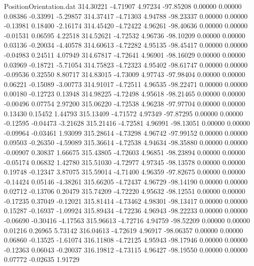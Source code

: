 \begin{filecontents}{PositionOrientation.dat}
 314.30221   -4.71907    4.97234   -97.85208    0.00000    0.00000    0.08386   -0.33991   -5.29857
 314.37417   -4.71303    4.94788   -98.23337    0.00000    0.00000   -0.13981    0.18400   -2.16174
 314.45420   -4.72422    4.96261   -98.40636    0.00000    0.00000   -0.01531    0.06595    4.22518
 314.52621   -4.72532    4.96736   -98.10209    0.00000    0.00000    0.03136   -0.20034   -4.40578
 314.60613   -4.72282    4.95135   -98.45417    0.00000    0.00000   -0.04983    0.24511    4.07949
 314.67817   -4.72641    4.96901   -98.16029    0.00000    0.00000    0.03969   -0.18721   -5.71054
 314.75823   -4.72323    4.95402   -98.61747    0.00000    0.00000   -0.09536    0.32550    8.80717
 314.83015   -4.73009    4.97743   -97.98404    0.00000    0.00000    0.06221   -0.15089   -3.00773
 314.91017   -4.72511    4.96535   -98.22471    0.00000    0.00000    0.00180   -0.12723    0.13948
 314.98225   -4.72498    4.95618   -98.21465    0.00000    0.00000   -0.00496    0.07754    2.97200
 315.06220   -4.72538    4.96238   -97.97704    0.00000    0.00000    0.13430    0.15452    1.44793
 315.13409   -4.71572    4.97349   -97.87295    0.00000    0.00000   -0.12595   -0.04473   -3.21628
 315.21416   -4.72581    4.96991   -98.13051    0.00000    0.00000   -0.09964   -0.03461    1.93099
 315.28614   -4.73298    4.96742   -97.99152    0.00000    0.00000    0.09503   -0.26350   -4.59089
 315.36614   -4.72538    4.94634   -98.35880    0.00000    0.00000   -0.00907    0.30837    1.66675
 315.43805   -4.72603    4.96851   -98.23894    0.00000    0.00000   -0.05174    0.06832    1.42780
 315.51030   -4.72977    4.97345   -98.13578    0.00000    0.00000    0.19748   -0.12347    3.87075
 315.59014   -4.71400    4.96359   -97.82675    0.00000    0.00000   -0.14424    0.05146   -4.38261
 315.66205   -4.72437    4.96729   -98.14190    0.00000    0.00000    0.02712   -0.13706    0.20479
 315.74209   -4.72220    4.95632   -98.12551    0.00000    0.00000   -0.17235    0.37049   -0.12021
 315.81414   -4.73462    4.98301   -98.13417    0.00000    0.00000    0.15287   -0.16937   -1.09924
 315.89434   -4.72236    4.96943   -98.22233    0.00000    0.00000   -0.06690   -0.30416   -4.17563
 315.96613   -4.72716    4.94759   -98.52209    0.00000    0.00000    0.01216    0.26965    5.73142
 316.04613   -4.72619    4.96917   -98.06357    0.00000    0.00000    0.06860   -0.13525   -1.61074
 316.11808   -4.72125    4.95943   -98.17946    0.00000    0.00000   -0.12363    0.06043   -0.20037
 316.19812   -4.73115    4.96427   -98.19550    0.00000    0.00000    0.07772   -0.02635    1.91729

\end{filecontents}
